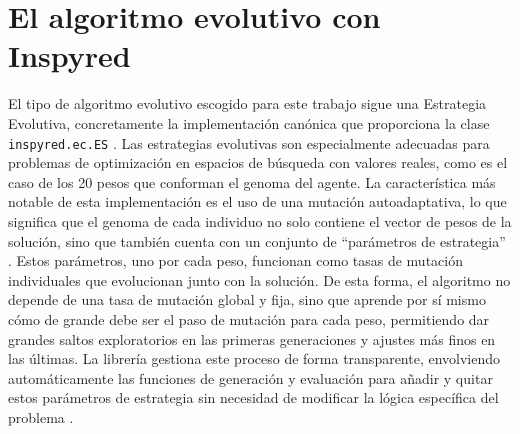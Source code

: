 \section{El algoritmo evolutivo con Inspyred} \label{sec:algoritmo_evolutivo_inspyred}

El tipo de algoritmo evolutivo escogido para este trabajo sigue una Estrategia Evolutiva, concretamente la implementación canónica que proporciona la clase \texttt{inspyred.ec.ES} \cite{aaron_garret_library_2025}. Las estrategias evolutivas son especialmente adecuadas para problemas de optimización en espacios de búsqueda con valores reales, como es el caso de los 20 pesos que conforman el genoma del agente. La característica más notable de esta implementación es el uso de una mutación autoadaptativa, lo que significa que el genoma de cada individuo no solo contiene el vector de pesos de la solución, sino que también cuenta con un conjunto de ``parámetros de estrategia'' \cite{aaron_garret_library_2025}. Estos parámetros, uno por cada peso, funcionan como tasas de mutación individuales que evolucionan junto con la solución. De esta forma, el algoritmo no depende de una tasa de mutación global y fija, sino que aprende por sí mismo cómo de grande debe ser el paso de mutación para cada peso, permitiendo dar grandes saltos exploratorios en las primeras generaciones y ajustes más finos en las últimas. La librería gestiona este proceso de forma transparente, envolviendo automáticamente las funciones de generación y evaluación para añadir y quitar estos parámetros de estrategia sin necesidad de modificar la lógica específica del problema \cite{aaron_garret_library_2025}.

